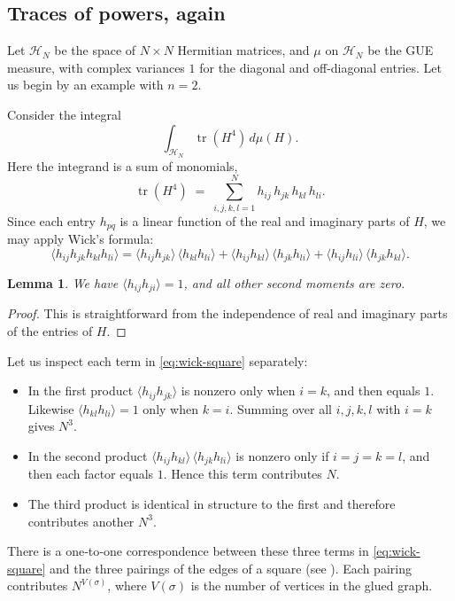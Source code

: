 \documentclass[letterpaper,11pt,oneside,reqno]{article}
\numberwithin{equation}{section}
\newtheorem{lemma}[proposition]{Lemma}
\theoremstyle{definition}
\begin{document}
\subsection{Traces of powers, again}
\label{subsec:traces-powers}


Let $\mathcal{H}_N$ be the space of $N\times N$ Hermitian matrices,
and $\mu$ on $\mathcal{H}_N$ be the GUE measure, with complex variances $1$
for the diagonal and off-diagonal entries.
Let us begin by an example with $n=2$.

Consider the integral
\[
  \int_{\mathcal{H}_N}\!\operatorname{tr}(H^4)\,d\mu(H).
\]
Here the integrand is a sum of monomials,
\[
  \operatorname{tr}(H^4)
  \;=\;
  \sum_{i,j,k,l=1}^N
    h_{ij}\,h_{jk}\,h_{kl}\,h_{li}.
\]
Since each entry $h_{pq}$ is a linear function of the real and imaginary parts
of $H$, we may apply Wick’s formula:
\begin{equation}\label{eq:wick-square}
  \bigl\langle h_{ij}h_{jk}h_{kl}h_{li}\bigr\rangle
  =
  \langle h_{ij}h_{jk}\rangle\,\langle h_{kl}h_{li}\rangle
  +
  \langle h_{ij}h_{kl}\rangle\,\langle h_{jk}h_{li}\rangle
  +
  \langle h_{ij}h_{li}\rangle\,\langle h_{jk}h_{kl}\rangle.
\end{equation}
\begin{lemma}
	We have $\langle h_{ij}h_{ji} \rangle =1$, and all other
	second moments are zero.
\end{lemma}
\begin{proof}
	This is straightforward from the independence of real and imaginary parts of the entries of $H$.
\end{proof}

Let us inspect each term in \eqref{eq:wick-square} separately:
\begin{itemize}
  \item In the first product
        $\langle h_{ij}h_{jk}\rangle$ is nonzero only when $i=k$, and then equals $1$.
        Likewise $\langle h_{kl}h_{li}\rangle=1$ only when $k=i$.  Summing over all $i,j,k,l$
        with $i=k$ gives $N^3$.

  \item In the second product
        $\langle h_{ij}h_{kl}\rangle\,\langle h_{jk}h_{li}\rangle$ is nonzero
        only if $i=j=k=l$, and then each factor equals $1$.  Hence this term contributes $N$.

  \item The third product is identical in structure to the first and therefore contributes another $N^3$.
\end{itemize}
There is a one‐to‐one correspondence between these three terms in \eqref{eq:wick-square}
and the three pairings of the edges of a square (see ).  Each pairing contributes
$N^{V(\sigma)}$, where $V(\sigma)$ is the number of vertices in the glued graph.
\end{document}

